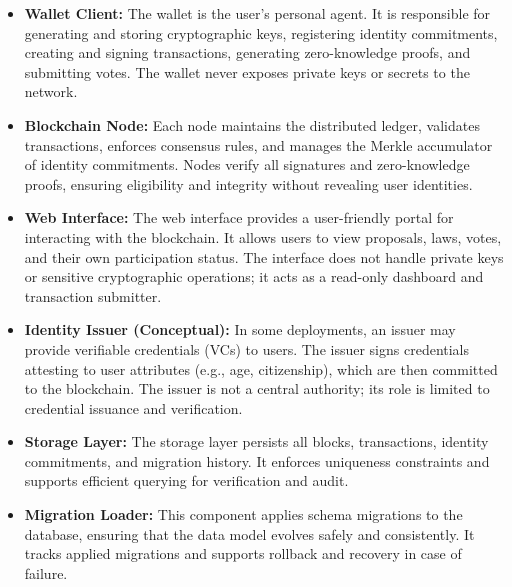 \documentclass[12pt,a4paper]{report}
\begin{document}
\begin{itemize}
  \item \textbf{Wallet Client:} The wallet is the user's personal agent. It is responsible for generating and storing cryptographic keys, registering identity commitments, creating and signing transactions, generating zero-knowledge proofs, and submitting votes. The wallet never exposes private keys or secrets to the network.
  \item \textbf{Blockchain Node:} Each node maintains the distributed ledger, validates transactions, enforces consensus rules, and manages the Merkle accumulator of identity commitments. Nodes verify all signatures and zero-knowledge proofs, ensuring eligibility and integrity without revealing user identities.
  \item \textbf{Web Interface:} The web interface provides a user-friendly portal for interacting with the blockchain. It allows users to view proposals, laws, votes, and their own participation status. The interface does not handle private keys or sensitive cryptographic operations; it acts as a read-only dashboard and transaction submitter.
  \item \textbf{Identity Issuer (Conceptual):} In some deployments, an issuer may provide verifiable credentials (VCs) to users. The issuer signs credentials attesting to user attributes (e.g., age, citizenship), which are then committed to the blockchain. The issuer is not a central authority; its role is limited to credential issuance and verification.
  \item \textbf{Storage Layer:} The storage layer persists all blocks, transactions, identity commitments, and migration history. It enforces uniqueness constraints and supports efficient querying for verification and audit.
  \item \textbf{Migration Loader:} This component applies schema migrations to the database, ensuring that the data model evolves safely and consistently. It tracks applied migrations and supports rollback and recovery in case of failure.
\end{itemize}
\end{document}
